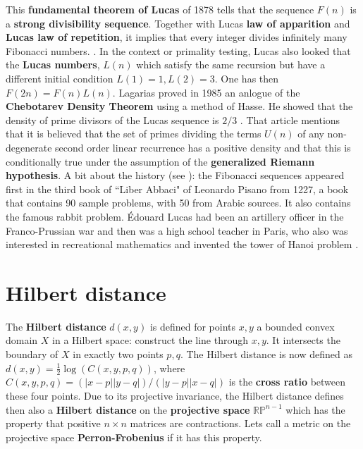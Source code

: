\documentclass[12pt]{amsart}
\begin{document}
This {\bf fundamental theorem of Lucas} of 1878 \cite{Lucas1878} tells that 
the sequence $F(n)$ is a {\bf strong divisibility sequence}. 
Together with Lucas {\bf law of apparition} and {\bf Lucas law of repetition},
it implies that every integer divides infinitely many Fibonacci numbers. 
\cite{Lagarias2014}.
In the context or primality testing, Lucas also looked that the 
{\bf Lucas numbers}, $L(n)$ which satisfy the same recursion 
but have a different initial condition $L(1)=1,L(2)=3$. One has then 
$F(2n)=F(n) L(n)$. Lagarias proved in 1985 an anlogue of the
{\bf Chebotarev Density Theorem} using a method of Hasse.
He showed that the
density of prime divisors of the Lucas sequence is $2/3$ \cite{Lagarias1985}.
That article mentions that it is believed that the set of primes dividing
the terms $U(n)$ of any non-degenerate second order linear 
recurrence has a positive density and that this is conditionally true 
under the assumption of the {\bf generalized Riemann hypothesis}.
A bit about the history (see \cite{Lagarias1985}): 
the Fibonacci sequences appeared first in the third book
of ``Liber Abbaci" of Leonardo Pisano from 1227, a book that contains 90 sample
problems, with 50 from Arabic sources. It also contains 
the famous rabbit problem.  \'Edouard Lucas 
had been an artillery officer in the Franco-Prussian war and then was a 
high school teacher in Paris, who also was interested in recreational mathematics
and invented the tower of Hanoi problem \cite{Lucas1891}.

\section{Hilbert distance}

The {\bf Hilbert distance} $d(x,y)$ is defined for points $x,y$ a bounded convex domain $X$
in a Hilbert space: construct the line through $x,y$. It intersects the boundary of $X$ in    
exactly two points $p,q$. The Hilbert distance is now defined as $d(x,y) = \frac{1}{2} \log(C(x,y,p,q))$,
where $C(x,y,p,q)=(|x-p| |y-q|)/(|y-p| |x-q|)$ is the {\bf cross ratio} between these four points.
Due to its projective invariance, the Hilbert distance defines then also
a {\bf Hilbert distance} on the {\bf projective space} $\mathbb{RP}^{n-1}$
which has the property that positive $n \times n$ matrices are contractions.
Lets call a metric on the projective space {\bf Perron-Frobenius} if it has 
this property. 
\end{document}
